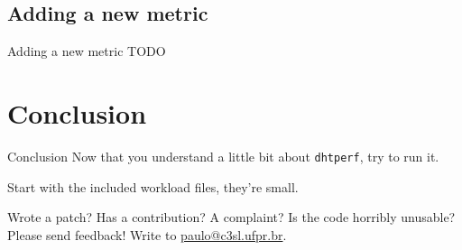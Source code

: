 \documentclass[compress]{beamer}
\newcommand{\dhtperf}{\texttt{dhtperf}}
\begin{document}
\subsection{Adding a new metric}
\begin{frame}{Adding a new metric}
TODO
\end{frame}

\section{Conclusion}
\begin{frame}{Conclusion}
Now that you understand a little bit about \dhtperf{}, try to run it.

Start with the included workload files, they're small.

Wrote a patch? Has a contribution? A complaint? Is the code horribly unusable?
Please send feedback! Write to \url{paulo@c3sl.ufpr.br}.
\end{frame}
\end{document}
